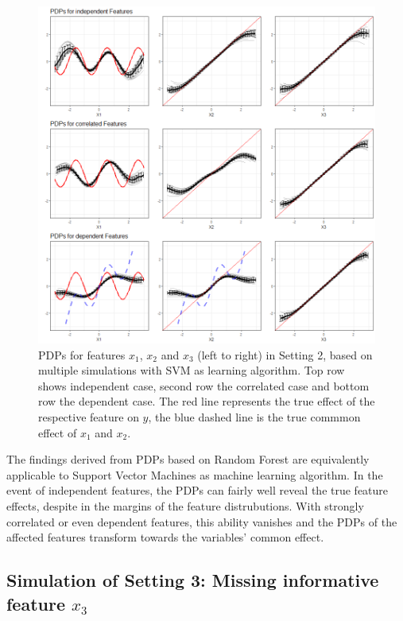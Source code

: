 \documentclass[
]{krantz}
\begin{document}
\begin{figure}

\includegraphics[width=1\linewidth]{images/VK_PDP_18_Set2_SVM} \hfill{}

\caption{PDPs for features $x_1$, $x_2$ and $x_3$ (left to right) in Setting 2, based on multiple simulations with SVM as learning algorithm. Top row shows independent case, second row the correlated case and bottom row the dependent case. The red line represents the true effect of the respective feature on $y$, the blue dashed line is the true commmon effect of $x_1$ and $x_2$.}\label{fig:Figure18}
\end{figure}

The findings derived from PDPs based on Random Forest are equivalently applicable to Support Vector Machines as machine learning algorithm. In the event of independent features, the PDPs can fairly well reveal the true feature effects, despite in the margins of the feature distrubutions. With strongly correlated or even dependent features, this ability vanishes and the PDPs of the affected features transform towards the variables' common effect.

\hypertarget{simulation-of-setting-3-missing-informative-feature-x_3}{%
\subsection{\texorpdfstring{Simulation of Setting 3: Missing informative feature \(x_3\)}{Simulation of Setting 3: Missing informative feature x\_3}}\label{simulation-of-setting-3-missing-informative-feature-x_3}}
\end{document}
